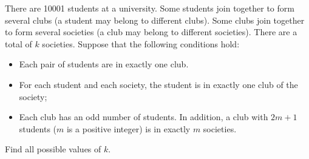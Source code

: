 There are 10001 students at a university. Some students join together to form several clubs (a student may belong to different clubs). Some clubs join together to form several societies (a club may belong to different societies). There are a total of $k$ societies. Suppose that the following conditions hold:
\begin{itemize}
\item[(i)] Each pair of students are in exactly one club.
\item[(ii)] For each student and each society, the student is in exactly one club of the society;
\item[(iii)] Each club has an odd number of students. In addition, a club with $2m+1$ students ($m$ is a positive integer) is in exactly $m$ societies.
\end{itemize}
Find all possible values of $k$.
